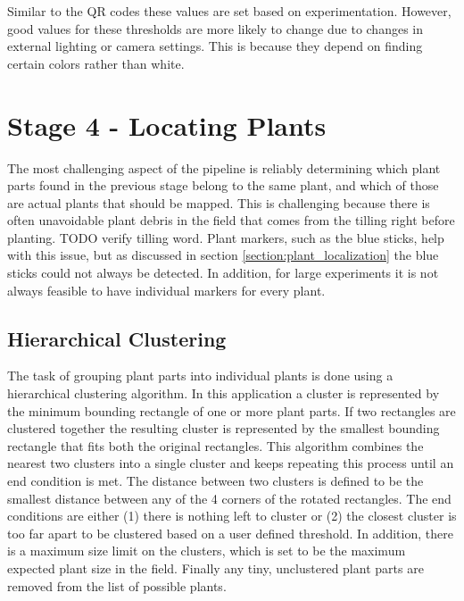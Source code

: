 Similar to the QR codes these values are set based on experimentation.   However, good values for these thresholds are more likely to change due to changes in external lighting or camera settings.  This is because they depend on finding certain colors rather than white.  

\section{Stage 4 - Locating Plants}
\label{processing-stage4}

The most challenging aspect of the pipeline is reliably determining which plant parts found in the previous stage belong to the same plant, and which of those are actual plants that should be mapped.  This is challenging because there is often unavoidable plant debris in the field that comes from the tilling right before planting. TODO verify tilling word.  Plant markers, such as the blue sticks, help with this issue, but as discussed in section \ref{section:plant_localization} the blue sticks could not always be detected.  In addition, for large experiments it is not always feasible to have individual markers for every plant.  

\subsection{Hierarchical Clustering}

The task of grouping plant parts into individual plants is done using a hierarchical clustering algorithm.  In this application a cluster is represented by the minimum bounding rectangle of one or more plant parts.  If two rectangles are clustered together the resulting cluster is represented by the smallest bounding rectangle that fits both the original rectangles.  This algorithm combines the nearest two clusters into a single cluster and keeps repeating this process until an end condition is met.  The distance between two clusters is defined to be the smallest distance between any of the 4 corners of the rotated rectangles.   The end conditions are either (1) there is nothing left to cluster or (2) the closest cluster is too far apart to be clustered based on a user defined threshold.  In addition, there is a maximum size limit on the clusters, which is set to be the maximum expected plant size in the field.  Finally any tiny, unclustered plant parts are removed from the list of possible plants. 

